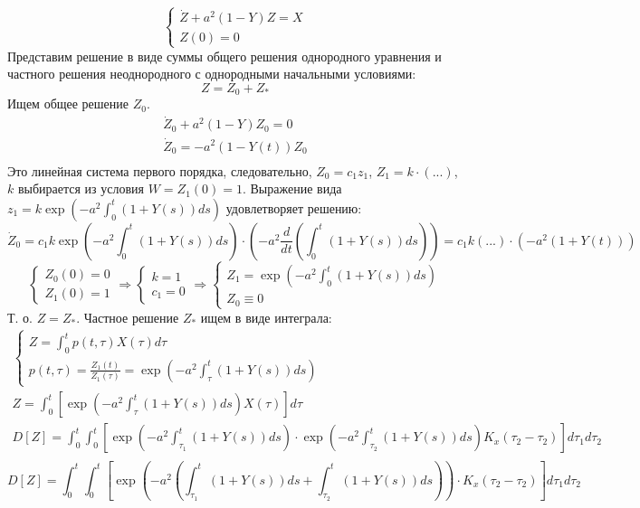 \documentclass[a4paper,12pt]{article}
\begin{document}
\[\begin{cases}
    \dot Z + a^2(1-Y) Z = X \\
    Z(0)=0
\end{cases}\]
Представим решение в виде суммы общего решения однородного уравнения и частного решения неоднородного с однородными начальными условиями:
 \[Z=Z_0 + Z_*\]
Ищем общее решение $Z_0$.
\begin{gather*}
    \dot Z_0 + a^2(1-Y)Z_0 = 0 \\
    \dot Z_0 = -a^2(1-Y(t))Z_0 \\
\end{gather*}
Это линейная система первого порядка, следовательно, $ Z_0 = c_1 z_1 $, $ Z_1 = k \cdot (...) $, $k$ выбирается из условия $ W = Z_1(0) = 1 $.
Выражение вида $ z_1 = k \exp\left(- a^2 \int_{0}^{t} (1+Y(s)) ds \right) $ удовлетворяет решению:
\[ \dot Z_0 = c_1 k \exp \left(- a^2 \int_{0}^{t} (1+Y(s)) ds \right) \cdot \left(- a^2 \frac{d}{dt} \left( \int_{0}^{t} (1+Y(s)) ds \right) \right) = c_1 k (...) \cdot (- a^2(1+Y(t))) \]
\[ \begin{cases}
    Z_0(0)=0 \\
    Z_1(0)=1
\end{cases} \Rightarrow
\begin{cases}
    k = 1 \\
    c_1 = 0
\end{cases} \Rightarrow
\begin{cases}
    Z_1 = \exp \left( - a^2 \int_{0}^{t} (1+Y(s)) ds \right) \\
    Z_0 \equiv 0
\end{cases} \]
Т. о. $ Z = Z_* $.
Частное решение $Z_*$ ищем в виде интеграла:
\begin{gather*}
    \begin{cases}
        Z = \int_{0}^{t} p(t, \tau) X(\tau) d \tau \\
        p(t,\tau) = \frac{Z_1(t)}{Z_1(\tau)} = \exp \left( - a^2 \int_{\tau}^{t} (1+Y(s)) ds \right)
    \end{cases} \\
    \boxed{ Z = \int_{0}^{t} \left[ \exp \left( - a^2 \int_{\tau}^{t} (1+Y(s)) ds \right) X(\tau) \right] d \tau } \\
    D[Z] = \int_{0}^{t} \int_{0}^{t} \left[
        \exp \left(- a^2 \int_{\tau_1}^{t} (1+Y(s)) ds \right) \cdot
        \exp \left(- a^2 \int_{\tau_2}^{t} (1+Y(s)) ds \right) K_x(\tau_2-\tau_2) \right] d\tau_1 d\tau_2 \\
\end{gather*}
\begin{equation}\label{eq:var}
    D[Z] = \int_{0}^{t} \int_{0}^{t} \left[
    \exp \left(- a^2 \left (\int_{\tau_1}^{t} (1+Y(s)) ds + \int_{\tau_2}^{t} (1+Y(s)) ds \right) \right) \cdot
    K_x(\tau_2-\tau_2) \right] d\tau_1 d\tau_2
\end{equation}
\end{document}
